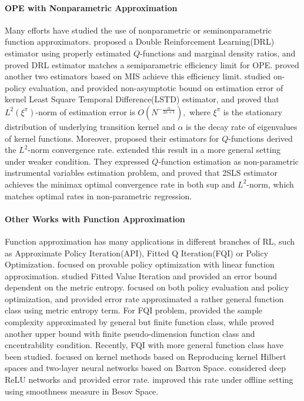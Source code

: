 \documentclass{article}
\numberwithin{equation}{section}
\theoremstyle{plain}
\theoremstyle{definition}
\theoremstyle{remark}
\begin{document}
\paragraph{OPE with Nonparametric Approximation}  Many efforts have studied the use of nonparametric or seminonparametric function approximators. \citep{kallus2020double} proposed a Double Reinforcement Learning(DRL) estimator using properly estimated $Q$-functions and marginal density ratios, and proved DRL estimator matches a semiparametric efficiency limit for OPE. \citep{uehara2020minimax} proved 
another two estimators based on MIS achieve this efficiency limit. \citep{duan2021optimal} studied on-policy evaluation, and provided non-asymptotic bound on estimation error of kernel Least Square Temporal Difference(LSTD) estimator, and proved that $L^2(\xi^\pi)$-norm of estimation error is $O\left(N^{-\frac{\alpha}{2\alpha + 1}}\right),$ where $\xi^\pi$ is the stationary distribution of underlying transition kernel and $\alpha$ is the decay rate of eigenvalues of kernel functions. Moreover, \citep{shi2021statistical,uehara2021finite} proposed their estimators for $Q$-functions derived the $L^2$-norm convergence rate. \citep{chen2022wellposedness} extended this result in a more general setting under weaker condition. They expressed $Q$-function estimation as non-parametric instrumental variables estimation problem, and proved that 2SLS estimator achieves the minimax optimal convergence rate in both sup and $L^2$-norm, which matches optimal rates in non-parametric regression. 

\paragraph{Other Works with Function Approximation} Function approximation has many applications in different branches of RL, such as Approximate Policy Iteration(API), Fitted Q Iteration(FQI) or Policy Optimization. \citep{cai2020provably,jin2019provably,zhou2021provably} focused on provable policy optimization with linear function approximation.  \citep{munos2008finite} studied Fitted Value Iteration and provided an error bound dependent on the metric entropy. \citep{farahmand2016regularized} focused on both policy evaluation and policy optimization, and provided error rate approximated a rather general function class using metric entropy term. For FQI problem, \citep{chen2019information} provided the sample complexity approximated by general but finite function class, while \citep{le2019batch} proved another upper bound with finite pseudo-dimension function class and cncentrability condition. Recently, FQI with more general function class have been studied. \citep{long2020neuralnetwork} focused on kernel methods based on Reproducing kernel Hilbert spaces and two-layer neural networks based on Barron Space. \citep{fan2020theoretical} considered deep ReLU networks and provided error rate. \citep{nguyentang2021sample} improved this rate under offline setting using smoothness measure in Besov Space. 
\end{document}
